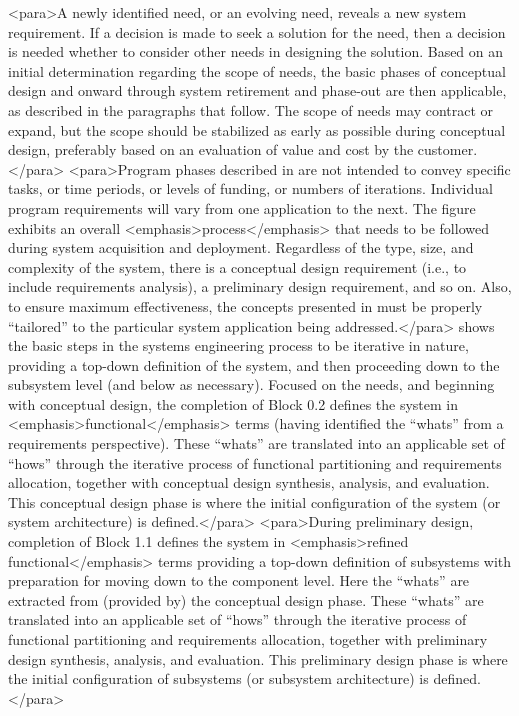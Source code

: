 <para>A newly identified need, or an evolving need, reveals a new system requirement. If a decision is made to seek a solution for the need, then a decision is needed whether to consider other needs in designing the solution. Based on an initial determination regarding the scope of needs, the basic phases of conceptual design and onward through system retirement and phase-out are then applicable, as described in the paragraphs that follow. The scope of needs may contract or expand, but the scope should be stabilized as early as possible during conceptual design, preferably based on an evaluation of value and cost by the customer.</para>
<para>Program phases described in are not intended to convey specific tasks, or time periods, or levels of funding, or numbers of iterations. Individual program requirements will vary from one application to the next. The figure exhibits an overall <emphasis>process</emphasis> that needs to be followed during system acquisition and deployment. Regardless of the type, size, and complexity of the system, there is a conceptual design requirement (i.e., to include requirements analysis), a preliminary design requirement, and so on. Also, to ensure maximum effectiveness, the concepts presented in must be properly “tailored” to the particular system application being addressed.</para>
shows the basic steps in the systems engineering process to be iterative in nature, providing a top-down definition of the system, and then proceeding down to the subsystem level (and below as necessary). Focused on the needs, and beginning with conceptual design, the completion of Block 0.2 defines the system in <emphasis>functional</emphasis> terms (having identified the “whats” from a requirements perspective). These “whats” are translated into an applicable set of “hows” through the iterative process of functional partitioning and requirements allocation, together with conceptual design synthesis, analysis, and evaluation. This conceptual design phase is where the initial configuration of the system (or system architecture) is defined.</para>
<para>During preliminary design, completion of Block 1.1 defines the system in <emphasis>refined functional</emphasis> terms providing a top-down definition of subsystems with preparation for moving down to the component level. Here the “whats” are extracted from (provided by) the conceptual design phase. These “whats” are translated into an applicable set of “hows” through the iterative process of functional partitioning and requirements allocation, together with preliminary design synthesis, analysis, and evaluation. This preliminary design phase is where the initial configuration of subsystems (or subsystem architecture) is defined.</para>
